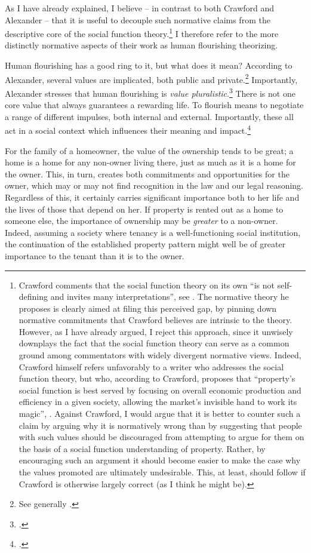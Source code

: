 As I have already explained, I believe -- in contrast to both Crawford and Alexander -- that it is useful to decouple such normative claims from the descriptive core of the social function theory.\footnote{Crawford comments that the social function theory on its own  ``is not self-defining and invites many interpretations'', see \cite[1089]{crawford11}. The normative theory he proposes is clearly aimed at filing this perceived gap, by pinning down normative commitments that Crawford believes are intrinsic to the theory. However, as I have already argued, I reject this approach, since it unwisely downplays the fact that the social function theory can serve as a common ground among commentators with widely divergent normative views. Indeed, Crawford himself refers unfavorably to a writer who addresses the social function theory, but who, according to Crawford, proposes that ``property's social function is best served by focusing on overall economic production and efficiency in a given society, allowing the market's invisible hand to work its magic'', \cite[see][1089]{crawford11}. Against Crawford, I would argue that it is better to counter such a claim by arguing why it is normatively wrong than by suggesting that people with such values should be discouraged from attempting to argue for them on the basis of a social function understanding of property. Rather, by encouraging such an argument it should become easier to make the case why the values promoted are ultimately undesirable. This, at least, should follow if Crawford is otherwise largely correct (as I think he might be).} I therefore refer to the more distinctly normative aspects of their work as human flourishing theorizing. 

Human flourishing has a good ring to it, but what does it mean? According to Alexander, several values are implicated, both public and private.\footnote{See generally \cite{alexander14,alexander11}.} Importantly, Alexander stresses that human flourishing is {\it value pluralistic}.\footnote{\cite[750-751]{alexander09}.} There is not one core value that always guarantees a rewarding life. To flourish means to negotiate a range of different impulses, both internal and external. Importantly, these all act in a social context which influences their meaning and impact.\footcite[1035-1052]{alexander11}

For the family of a homeowner, the value of the ownership tends to be great; a home is a home for any non-owner living there, just as much as it is a home for the owner. This, in turn, creates both commitments and opportunities for the owner, which may or may not find recognition in the law and our legal reasoning. Regardless of this, it certainly carries significant importance both to her life and the lives of those that depend on her. If property is rented out as a home to someone else, the importance of ownership may be {\it greater} to a non-owner. Indeed, assuming a society where tenancy is a well-functioning social institution, the continuation of the established property pattern might well be of greater importance to the tenant than it is to the owner.

